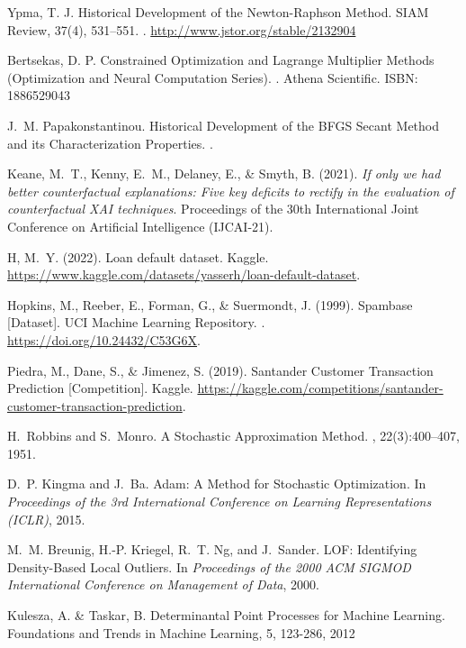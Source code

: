 \documentclass[12pt]{extarticle}
\numberwithin{equation}{section}
\begin{document}
\begin{thebibliography}{99}
Ypma, T. J. 
\newblock Historical Development of the Newton-Raphson Method. SIAM Review, 37(4), 531–551. 
.
\newblock \url{http://www.jstor.org/stable/2132904}

Bertsekas, D. P. 
\newblock Constrained Optimization and Lagrange Multiplier Methods (Optimization and Neural Computation Series).
.
\newblock Athena Scientific. ISBN: 1886529043

J.~M. Papakonstantinou.
\newblock Historical Development of the BFGS Secant Method and its Characterization Properties.
.

Keane, M.~T., Kenny, E.~M., Delaney, E., \& Smyth, B. (2021).
\newblock \textit{If only we had better counterfactual explanations:
Five key deficits to rectify in the evaluation of counterfactual XAI techniques}.
Proceedings of the 30th International Joint Conference on Artificial
Intelligence (IJCAI-21).

\newblock H, M.~Y. (2022). Loan default dataset. Kaggle. 
\newblock \url{https://www.kaggle.com/datasets/yasserh/loan-default-dataset}.

\newblock Hopkins, M., Reeber, E., Forman, G., \& Suermondt, J. (1999). Spambase [Dataset]. UCI Machine Learning Repository. .
\newblock \url{https://doi.org/10.24432/C53G6X}.

\newblock Piedra, M., Dane, S., \& Jimenez, S. (2019). Santander Customer Transaction Prediction [Competition]. Kaggle.
\newblock \url{https://kaggle.com/competitions/santander-customer-transaction-prediction}.

H.~Robbins and S.~Monro.
\newblock A Stochastic Approximation Method.
, 22(3):400--407, 1951.

D.~P. Kingma and J.~Ba.
\newblock Adam: A Method for Stochastic Optimization.
\newblock In {\em Proceedings of the 3rd International Conference on Learning Representations (ICLR)}, 2015.

M.~M. Breunig, H.-P. Kriegel, R.~T. Ng, and J.~Sander.
\newblock LOF: Identifying Density-Based Local Outliers.
\newblock In {\em Proceedings of the 2000 ACM SIGMOD International Conference on Management of Data}, 2000.

Kulesza, A. \& Taskar, B.
\newblock Determinantal Point Processes for Machine Learning.
\newblock Foundations and Trends in Machine Learning, 5, 123-286, 2012


\end{thebibliography}
\end{document}
